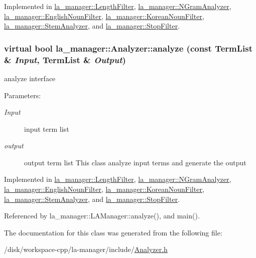 Implemented in \hyperlink{classla__manager_1_1LengthFilter_0b26aaa94ed79a49609fb92e25109831}{la\_\-manager::LengthFilter}, \hyperlink{classla__manager_1_1NGramAnalyzer_9774217127e1d89b57ff5aded31df290}{la\_\-manager::NGramAnalyzer}, \hyperlink{classla__manager_1_1EnglishNounFilter_a74c3ab1bb4af5b8e3f4693e4181c213}{la\_\-manager::EnglishNounFilter}, \hyperlink{classla__manager_1_1KoreanNounFilter_0ec4dcffc74feee2b7f72a2656c9c589}{la\_\-manager::KoreanNounFilter}, \hyperlink{classla__manager_1_1StemAnalyzer_a3ad462a3d098e7abfbab604b47d1f21}{la\_\-manager::StemAnalyzer}, and \hyperlink{classla__manager_1_1StopFilter_17b962063274fdae433e111a39d80f22}{la\_\-manager::StopFilter}.\hypertarget{classla__manager_1_1Analyzer_a096ba4b2faeaa0f3938d7b826ab1c78}{
\subsubsection[{analyze}]{\setlength{\rightskip}{0pt plus 5cm}virtual bool la\_\-manager::Analyzer::analyze (const {\bf TermList} \& {\em Input}, \/  {\bf TermList} \& {\em Output})}}
\label{classla__manager_1_1Analyzer_a096ba4b2faeaa0f3938d7b826ab1c78}


analyze interface 

\begin{Desc}
\item[Parameters:]
\begin{description}
\item[{\em Input}]input term list \item[{\em output}]output term list This class analyze input terms and generate the output \end{description}
\end{Desc}


Implemented in \hyperlink{classla__manager_1_1LengthFilter_9a4d7237f42892d2ed54ab22d3411741}{la\_\-manager::LengthFilter}, \hyperlink{classla__manager_1_1NGramAnalyzer_09bdd966dba6ac9b3ef4858fd0b24699}{la\_\-manager::NGramAnalyzer}, \hyperlink{classla__manager_1_1EnglishNounFilter_8d45f1cdea331de42838fcf89de9c576}{la\_\-manager::EnglishNounFilter}, \hyperlink{classla__manager_1_1KoreanNounFilter_5722385ced3635d7d5f16cbc1db0f874}{la\_\-manager::KoreanNounFilter}, \hyperlink{classla__manager_1_1StemAnalyzer_bd1334a97df94c78f58a02a7af73d55a}{la\_\-manager::StemAnalyzer}, and \hyperlink{classla__manager_1_1StopFilter_455c6f7e8330c3684ffd548956fe7a16}{la\_\-manager::StopFilter}.

Referenced by la\_\-manager::LAManager::analyze(), and main().

The documentation for this class was generated from the following file:\begin{CompactItemize}
\item 
/disk/workspace-cpp/la-manager/include/\hyperlink{Analyzer_8h}{Analyzer.h}\end{CompactItemize}
